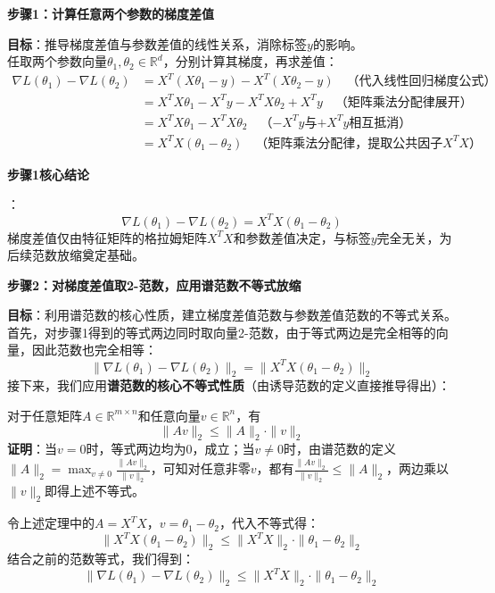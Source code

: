 \documentclass[10pt]{article}
\numberwithin{equation}{section}
\theoremstyle{plain}
\theoremstyle{definition}
\theoremstyle{remark}
\begin{document}
{\par\vspace{0.8ex}\noindent\normalsize\bfseries\color{secblue} 步骤1：计算任意两个参数的梯度差值\par}
\textbf{目标}：推导梯度差值与参数差值的线性关系，消除标签$y$的影响。\\
任取两个参数向量$\theta_1, \theta_2 \in \mathbb{R}^d$，分别计算其梯度，再求差值：
\[
\begin{aligned}
\nabla L(\theta_1) - \nabla L(\theta_2)
&= X^T (X \theta_1 - y) - X^T (X \theta_2 - y) \quad \text{（代入线性回归梯度公式）} \\
&= X^T X \theta_1 - X^T y - X^T X \theta_2 + X^T y \quad \text{（矩阵乘法分配律展开）} \\
&= X^T X \theta_1 - X^T X \theta_2 \quad \text{（$-X^T y$与$+X^T y$相互抵消）} \\
&= X^T X (\theta_1 - \theta_2) \quad \text{（矩阵乘法分配律，提取公共因子$X^T X$）}
\end{aligned}
\]
{\par\vspace{0.8ex}\noindent\normalsize\bfseries\color{secblue} 步骤1核心结论\par}：
\[ \nabla L(\theta_1) - \nabla L(\theta_2) = X^T X (\theta_1 - \theta_2) \]
梯度差值仅由特征矩阵的格拉姆矩阵$X^T X$和参数差值决定，与标签$y$完全无关，为后续范数放缩奠定基础。

{\par\vspace{0.8ex}\noindent\normalsize\bfseries\color{secblue} 步骤2：对梯度差值取2-范数，应用谱范数不等式放缩\par}
\textbf{目标}：利用谱范数的核心性质，建立梯度差值范数与参数差值范数的不等式关系。\\
首先，对步骤1得到的等式两边同时取向量2-范数，由于等式两边是完全相等的向量，因此范数也完全相等：
\[ \|\nabla L(\theta_1) - \nabla L(\theta_2)\|_2 = \| X^T X (\theta_1 - \theta_2) \|_2 \]
接下来，我们应用\textbf{谱范数的核心不等式性质}（由诱导范数的定义直接推导得出）：
\begin{RemarkBox}[定理]
对于任意矩阵$A \in \mathbb{R}^{m \times n}$和任意向量$v \in \mathbb{R}^n$，有
\[ \| A v \|_2 \le \| A \|_2 \cdot \| v \|_2 \]
\textbf{证明}：当$v=0$时，等式两边均为0，成立；当$v \neq 0$时，由谱范数的定义$\|A\|_2 = \max_{v \neq 0} \frac{\|A v\|_2}{\|v\|_2}$，可知对任意非零$v$，都有$\frac{\|A v\|_2}{\|v\|_2} \le \|A\|_2$，两边乘以$\|v\|_2$即得上述不等式。
\end{RemarkBox}
令上述定理中的$A = X^T X$，$v = \theta_1 - \theta_2$，代入不等式得：
\[ \| X^T X (\theta_1 - \theta_2) \|_2 \le \| X^T X \|_2 \cdot \| \theta_1 - \theta_2 \|_2 \]
结合之前的范数等式，我们得到：
\[ \|\nabla L(\theta_1) - \nabla L(\theta_2)\|_2 \le \| X^T X \|_2 \cdot \| \theta_1 - \theta_2 \|_2 \]
\end{document}
